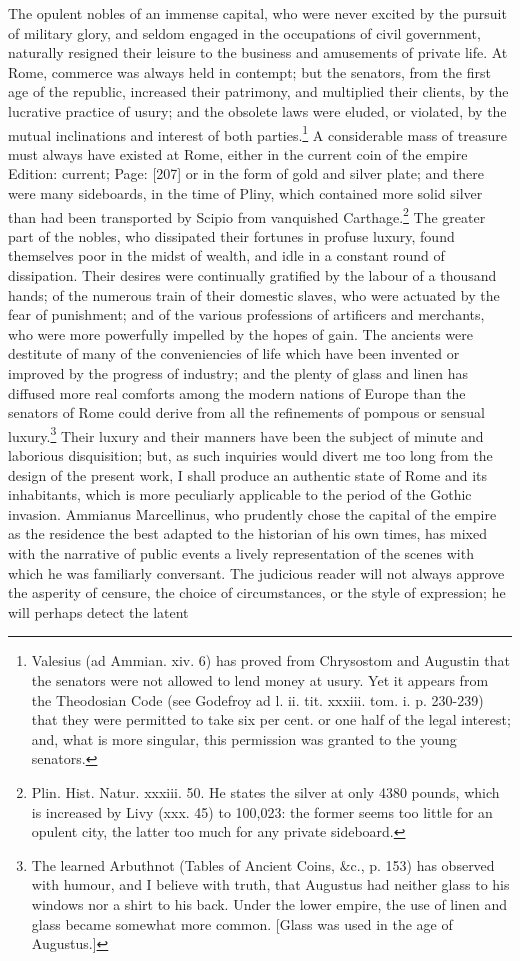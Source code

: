 The opulent nobles of an immense capital, who were never excited by the pursuit of military glory, and seldom engaged in the occupations of civil government, naturally resigned their leisure to the business and amusements of private life. At Rome, commerce was always held in contempt; but the senators, from the first age of the republic, increased their patrimony, and multiplied their clients, by the lucrative practice of usury; and the obsolete laws were eluded, or violated, by the mutual inclinations and interest of both parties.\footnote{Valesius (ad Ammian. xiv. 6) has proved from Chrysostom and Augustin that the senators were not allowed to lend money at usury. Yet it appears from the Theodosian Code (see Godefroy ad l. ii. tit. xxxiii. tom. i. p. 230-239) that they were permitted to take six per cent. or one half of the legal interest; and, what is more singular, this permission was granted to the young senators.} A considerable mass of treasure must always have existed at Rome, either in the current coin of the empire Edition: current; Page: [207] or in the form of gold and silver plate; and there were many sideboards, in the time of Pliny, which contained more solid silver than had been transported by Scipio from vanquished Carthage.\footnote{Plin. Hist. Natur. xxxiii. 50. He states the silver at only 4380 pounds, which is increased by Livy (xxx. 45) to 100,023: the former seems too little for an opulent city, the latter too much for any private sideboard.} The greater part of the nobles, who dissipated their fortunes in profuse luxury, found themselves poor in the midst of wealth, and idle in a constant round of dissipation. Their desires were continually gratified by the labour of a thousand hands; of the numerous train of their domestic slaves, who were actuated by the fear of punishment; and of the various professions of artificers and merchants, who were more powerfully impelled by the hopes of gain. The ancients were destitute of many of the conveniencies of life which have been invented or improved by the progress of industry; and the plenty of glass and linen has diffused more real comforts among the modern nations of Europe than the senators of Rome could derive from all the refinements of pompous or sensual luxury.\footnote{The learned Arbuthnot (Tables of Ancient Coins, \&c., p. 153) has observed with humour, and I believe with truth, that Augustus had neither glass to his windows nor a shirt to his back. Under the lower empire, the use of linen and glass became somewhat more common. [Glass was used in the age of Augustus.]} Their luxury and their manners have been the subject of minute and laborious disquisition; but, as such inquiries would divert me too long from the design of the present work, I shall produce an authentic state of Rome and its inhabitants, which is more peculiarly applicable to the period of the Gothic invasion. Ammianus Marcellinus, who prudently chose the capital of the empire as the residence the best adapted to the historian of his own times, has mixed with the narrative of public events a lively representation of the scenes with which he was familiarly conversant. The judicious reader will not always approve the asperity of censure, the choice of circumstances, or the style of expression; he will perhaps detect the latent 
